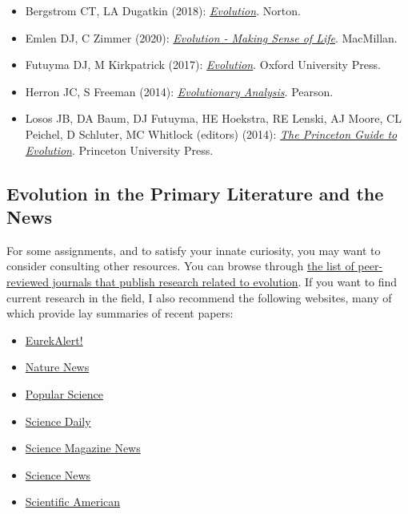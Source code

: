 \documentclass[
]{book}
\begin{document}
\begin{itemize}
\item
  Bergstrom CT, LA Dugatkin (2018): \href{https://wwnorton.com/books/Evolution/}{\emph{Evolution}}. Norton.
\item
  Emlen DJ, C Zimmer (2020): \href{https://www.macmillanlearning.com/college/us/product/Evolution/p/1319079865}{\emph{Evolution - Making Sense of Life}}. MacMillan.
\item
  Futuyma DJ, M Kirkpatrick (2017): \href{https://global.oup.com/ushe/product/evolution-9781605356051?cc=us\&lang=en\&}{\emph{Evolution}}. Oxford University Press.
\item
  Herron JC, S Freeman (2014): \href{https://www.pearson.com/us/higher-education/program/Herron-Evolutionary-Analysis-5th-Edition/PGM296285.html}{\emph{Evolutionary Analysis}}. Pearson.
\item
  Losos JB, DA Baum, DJ Futuyma, HE Hoekstra, RE Lenski, AJ Moore, CL Peichel, D Schluter, MC Whitlock (editors) (2014): \href{https://k-state-primo.hosted.exlibrisgroup.com/permalink/f/1aco38j/01KSU_ALMA51277244700002401}{\emph{The Princeton Guide to Evolution}}. Princeton University Press.
\end{itemize}

\hypertarget{evolution-in-the-primary-literature-and-the-news}{%
\subsection{Evolution in the Primary Literature and the News}\label{evolution-in-the-primary-literature-and-the-news}}

For some assignments, and to satisfy your innate curiosity, you may want to consider consulting other resources. You can browse through \href{http://evolution-textbook.org/content/free/notes/box_journal_list.html}{the list of peer-reviewed journals that publish research related to evolution}. If you want to find current research in the field, I also recommend the following websites, many of which provide lay summaries of recent papers:

\begin{itemize}
\item
  \href{https://www.eurekalert.org/}{EurekAlert!}
\item
  \href{https://www.nature.com/news}{Nature News}
\item
  \href{https://www.popsci.com/}{Popular Science}
\item
  \href{https://www.sciencedaily.com/}{Science Daily}
\item
  \href{https://www.sciencemag.org/news}{Science Magazine News}
\item
  \href{https://www.sciencenews.org/}{Science News}
\item
  \href{https://www.scientificamerican.com/}{Scientific American}
\end{itemize}
\end{document}
